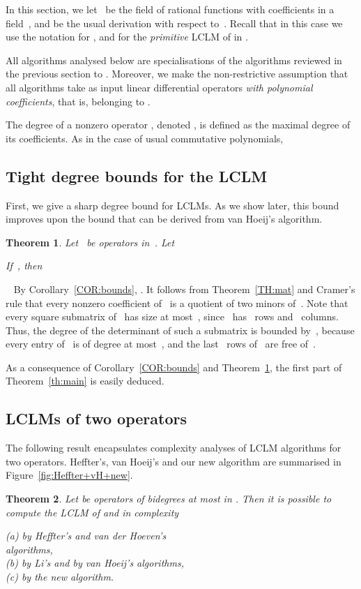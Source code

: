 \documentclass{sig-alt-full}
\def\myproof{\noindent{\sc Proof.}~}
\def\foorp{\hfill}
\newtheorem{theorem}{Theorem}
\begin{document}
In this section, we let~ be the field of rational functions with
coefficients in a field~, and  be the usual
derivation with respect to~. Recall that in this case we use the notation
 for , and 
for the \emph{primitive\/} LCLM of  in  .

All algorithms analysed below are specialisations of the algorithms reviewed
in the previous section to . Moreover,  we make the non-restrictive assumption that all algorithms take as input linear differential operators
\emph{with polynomial coefficients}, that is, belonging to .

The degree of a nonzero operator , denoted ,
is defined as the maximal degree of its coefficients.
As in the case of usual commutative polynomials,


\subsection{Tight degree bounds for the LCLM}
First, we give a sharp degree bound for LCLMs. As we show later, this bound improves upon the bound that can be derived from van Hoeij's algorithm.
\begin{theorem} \label{TH:db}
Let~ be operators in~. Let

If~, then

\end{theorem}

\myproof
By Corollary~\ref{COR:bounds}, . It follows from Theorem~\ref{TH:mat}
and Cramer's rule
that every nonzero coefficient of~ is a quotient of two 
minors of~. Note that every square submatrix of~ has size at
most~, since~ has~ rows and~ columns. Thus, the
degree of the determinant of such a submatrix is bounded by~,
because every entry of~ is of degree at most~, and the
last~ rows of~ are free of~. \foorp

As a consequence of Corollary~\ref{COR:bounds} and Theorem~\ref{TH:db}, 
the first part of Theorem~\ref{th:main} is easily deduced.

\subsection{LCLMs of two operators}
The following result encapsulates complexity analyses of LCLM algorithms for two operators. Heffter's, van Hoeij's and our new algorithm are summarised in Figure~\ref{fig:Heffter+vH+new}.

\begin{theorem}\label{theo:compl-2ops}
Let  be operators of bidegrees at most  in .	
Then it is possible to compute the LCLM of  and  in complexity
\begin{tabbing}
	\quad \emph{(a)}  by Heffter's and van der Hoeven's \\ algorithms,\\
	\quad \emph{(b)}  by Li's and by van Hoeij's algorithms,\\
	\quad \emph{(c)}  by the new algorithm.
\end{tabbing}
\end{theorem}
\end{document}
